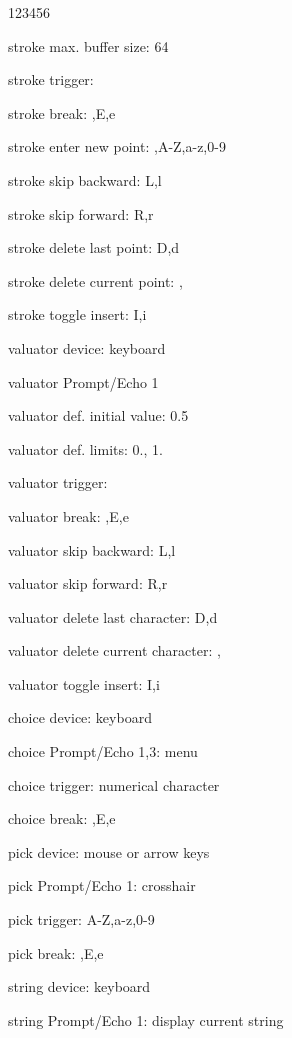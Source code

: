 \begin{DLtt}{123456}
\item[stroke max. buffer size:]64
\item[stroke trigger:]
\item[stroke break:],E,e
\item[stroke enter new point:],A-Z,a-z,0-9
\item[stroke skip backward:]L,l
\item[stroke skip forward:]R,r
\item[stroke delete last point:]D,d
\item[stroke delete current point:], 
\item[stroke toggle insert:]I,i
\item[valuator device:]keyboard
\item[valuator Prompt/Echo 1]
\item[valuator def. initial value:]0.5
\item[valuator def. limits:]0., 1.
\item[valuator trigger:]
\item[valuator break:],E,e
\item[valuator skip backward:]L,l
\item[valuator skip forward:]R,r
\item[valuator delete last character:]D,d
\item[valuator delete current character:], 
\item[valuator toggle insert:]I,i
\item[choice device:]keyboard
\item[choice Prompt/Echo 1,3:]menu
\item[choice trigger:]numerical character 
\item[choice break:],E,e
\item[pick device:]mouse or arrow keys
\item[pick Prompt/Echo 1: crosshair]
\item[pick trigger:]A-Z,a-z,0-9
\item[pick break:],E,e
\item[string device:]keyboard
\item[string Prompt/Echo 1:]display current string

\end{DLtt}
